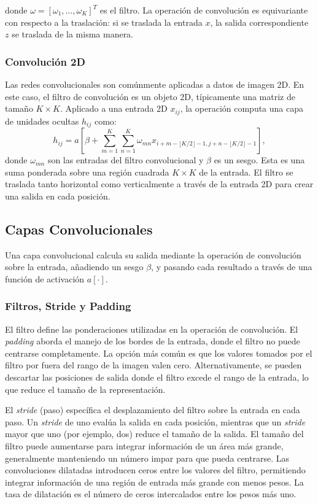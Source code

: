 donde $\omega = [\omega_1, \dots, \omega_K]^T$ es el filtro. La operación de convolución es equivariante con respecto a la traslación: si se traslada la entrada $x$, la salida correspondiente $z$ se traslada de la misma manera.

        \subsubsection{Convolución 2D}
Las redes convolucionales son comúnmente aplicadas a datos de imagen 2D. En este caso, el filtro de convolución es un objeto 2D, típicamente una matriz de tamaño $K \times K$. Aplicado a una entrada 2D $x_{ij}$, la operación computa una capa de unidades ocultas $h_{ij}$ como:
\begin{equation}
h_{ij} = a\left[\beta + \sum_{m=1}^{K} \sum_{n=1}^{K} \omega_{mn}x_{i+m-\lfloor K/2 \rfloor-1, j+n-\lfloor K/2 \rfloor-1}\right],
\label{eq:conv2d}
\end{equation}
donde $\omega_{mn}$ son las entradas del filtro convolucional y $\beta$ es un sesgo. Esta es una suma ponderada sobre una región cuadrada $K \times K$ de la entrada. El filtro se traslada tanto horizontal como verticalmente a través de la entrada 2D para crear una salida en cada posición.

    \subsection{Capas Convolucionales}
Una capa convolucional calcula su salida mediante la operación de convolución sobre la entrada, añadiendo un sesgo $\beta$, y pasando cada resultado a través de una función de activación $a[\cdot]$.

\subsubsection{Filtros, Stride y Padding}
    El filtro define las ponderaciones utilizadas en la operación de convolución. El \textit{padding} aborda el manejo de los bordes de la entrada, donde el filtro no puede centrarse completamente. La opción más común es que los valores tomados por el filtro por fuera del rango de la imagen valen cero. Alternativamente, se pueden descartar las posiciones de salida donde el filtro excede el rango de la entrada, lo que reduce el tamaño de la representación.

El \textit{stride} (paso) específica el desplazamiento del filtro sobre la entrada en cada paso. Un \textit{stride} de uno evalúa la salida en cada posición, mientras que un \textit{stride} mayor que uno (por ejemplo, dos) reduce el tamaño de la salida. El tamaño del filtro puede aumentarse para integrar información de un área más grande, generalmente manteniendo un número impar para que pueda centrarse. Las convoluciones dilatadas introducen ceros entre los valores del filtro, permitiendo integrar información de una región de entrada más grande con menos pesos. La tasa de dilatación es el número de ceros intercalados entre los pesos más uno.


